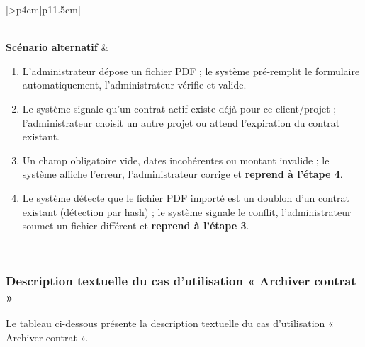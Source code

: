 \begin{longtable}{|>{}p{4cm}|p{11.5cm}|}
\begin{minipage}[t]{\linewidth}
\begin{enumerate}[label=\arabic*., leftmargin=*]
\end{enumerate}
\vspace{2pt}
\end{minipage} \\
\hline
\textbf{Scénario alternatif} &
\begin{enumerate}[label=A\arabic*.,nosep,leftmargin=0.6cm,topsep=0pt,itemsep=1pt]
\item  L'administrateur dépose un fichier PDF ; le système pré-remplit le formulaire automatiquement, l'administrateur vérifie et valide.
\item  Le système signale qu'un contrat actif existe déjà pour ce client/projet ; l'administrateur choisit un autre projet ou attend l'expiration du contrat existant.
\item  Un champ obligatoire vide, dates incohérentes ou montant invalide ; le système affiche l'erreur, l'administrateur corrige et \textbf{reprend à l'étape 4}.
\item Le système détecte que le fichier PDF importé est un doublon 
d'un contrat existant (détection par hash) ; le système 
signale le conflit, l'administrateur soumet un fichier différent et 
\textbf{reprend à l'étape 3}.
\end{enumerate} \\
\hline

\end{longtable}
\normalsize

\subsubsection{Description textuelle du cas d’utilisation « Archiver contrat »}
Le tableau ci-dessous présente la description textuelle du cas d’utilisation « Archiver contrat ».


